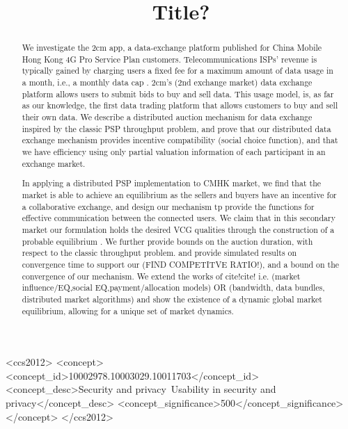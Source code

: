\documentclass[sigconf, anonymous]{acmart}
\theoremstyle{definition}
\begin{document}
\title{Title?} 

\begin{abstract}
We investigate the 2cm app, a data-exchange platform published for China Mobile Hong
Kong 4G Pro Service Plan customers. Telecommunications ISPs' revenue is typically
gained by charging users a fixed fee for a maximum amount
of data usage in a month, i.e., a monthly data cap \cite{???}. 
2cm's (2nd exchange market) data exchange platform allows users to submit
bids to buy and sell data.
This usage model, is, as far as our knowledge, the first data trading
platform that allows customers to buy and sell their own data.
We describe a distributed auction mechanism for data exchange inspired by the
classic PSP throughput problem,
and prove that our distributed data exchange mechanism provides incentive
compatibility (social choice function), and that we have efficiency
using only partial valuation information of each participant in an exchange market.

In applying a distributed PSP implementation to CMHK market, we
find that
the market is able to achieve an equilibrium as the sellers and buyers have an
incentive for a collaborative exchange, and design our mechanism tp provide the functions
for effective communication between the connected users. We claim that in
this secondary market our formulation holds the desired VCG qualities through the construction of a
probable equilibrium \cite{???}. We further provide bounds on the auction duration, 
with respect to the classic throughput problem.
and provide simulated results on convergence time to support our (FIND
COMPETITVE RATIO!), and a bound
on the convergence of our mechanism. We extend the works of cite!cite!
i.e. (market influence/EQ,social EQ,payment/allocation models) OR (bandwidth, data bundles, distributed
market algorithms) and show the existence of a dynamic global market equilibrium, allowing for a unique set of market dynamics.
\end{abstract}

\iffalse
\begin{CCSXML}
<ccs2012>
<concept>
<concept_id>10002978.10003029.10011703</concept_id>
<concept_desc>Security and privacy~Usability in security and privacy</concept_desc>
<concept_significance>500</concept_significance>
</concept>
</ccs2012>
\end{CCSXML}
\end{document}
